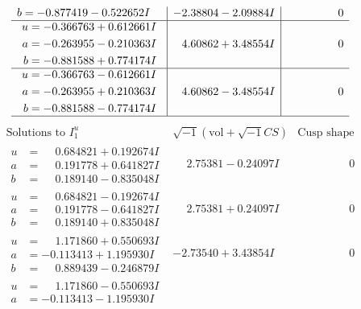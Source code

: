 \documentclass[1p]{elsarticle_modified}
\theoremstyle{definition}
\newcommand{\I}{\sqrt{-1}}
\begin{document}
$$\begin{array}{c|c|c}
\begin{aligned}
b &= -0.877419 - 0.522652 I\end{aligned}
 & -2.38804 - 2.09884 I & \phantom{-0.000000 } 0 \\ \hline\begin{aligned}
u &= -0.366763 + 0.612661 I \\
a &= -0.263955 - 0.210363 I \\
b &= -0.881588 + 0.774174 I\end{aligned}
 & \phantom{-}4.60862 + 3.48554 I & \phantom{-0.000000 } 0 \\ \hline\begin{aligned}
u &= -0.366763 - 0.612661 I \\
a &= -0.263955 + 0.210363 I \\
b &= -0.881588 - 0.774174 I\end{aligned}
 & \phantom{-}4.60862 - 3.48554 I & \phantom{-0.000000 } 0\\
 \hline 
 \end{array}$$\newpage$$\begin{array}{c|c|c}  
\text{Solutions to }I^u_{1}& \I (\text{vol} + \sqrt{-1}CS) & \text{Cusp shape}\\
 \hline 
\begin{aligned}
u &= \phantom{-}0.684821 + 0.192674 I \\
a &= \phantom{-}0.191778 + 0.641827 I \\
b &= \phantom{-}0.189140 - 0.835048 I\end{aligned}
 & \phantom{-}2.75381 - 0.24097 I & \phantom{-0.000000 } 0 \\ \hline\begin{aligned}
u &= \phantom{-}0.684821 - 0.192674 I \\
a &= \phantom{-}0.191778 - 0.641827 I \\
b &= \phantom{-}0.189140 + 0.835048 I\end{aligned}
 & \phantom{-}2.75381 + 0.24097 I & \phantom{-0.000000 } 0 \\ \hline\begin{aligned}
u &= \phantom{-}1.171860 + 0.550693 I \\
a &= -0.113413 + 1.195930 I \\
b &= \phantom{-}0.889439 - 0.246879 I\end{aligned}
 & -2.73540 + 3.43854 I & \phantom{-0.000000 } 0 \\ \hline\begin{aligned}
u &= \phantom{-}1.171860 - 0.550693 I \\
a &= -0.113413 - 1.195930 I \\

\end{aligned}
\end{array}$$
\end{document}
